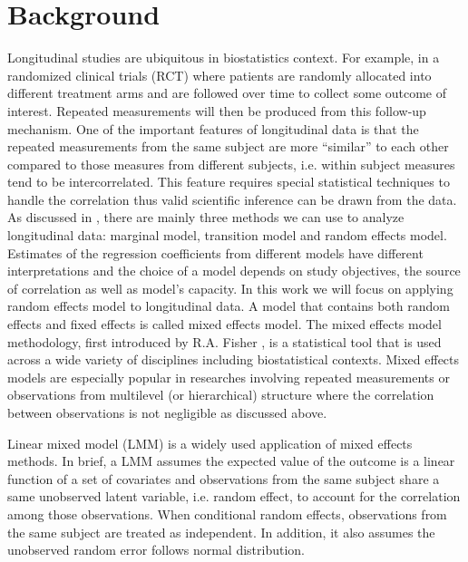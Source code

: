 \documentclass{article}
\begin{document}
\section{Background}
Longitudinal studies are ubiquitous in biostatistics context. For example, in a randomized clinical trials (RCT) where patients are randomly allocated into different treatment arms and are followed over time to collect some outcome of interest. Repeated measurements will then be produced from this follow-up mechanism. One of the important features of longitudinal data is that the repeated measurements from the same subject are more ``similar'' to each other compared to those measures from different subjects, i.e. within subject measures tend to be intercorrelated. This feature requires special statistical techniques to handle the correlation thus valid scientific inference can be drawn from the data. As discussed in \citep{diggle2002analysis}, there are mainly three methods we can use to analyze longitudinal data: marginal model, transition model and random effects model. Estimates of the regression coefficients from different models have different interpretations and the choice of a model depends on study objectives, the source of correlation as well as model's capacity. In this work we will focus on applying random effects model to longitudinal data. A model that contains both random effects and fixed effects is called mixed effects model. The mixed effects model methodology, first introduced by R.A. Fisher \citep{fisher1919xv},  is a statistical tool that is used across a wide variety of disciplines including biostatistical contexts. Mixed effects models are especially popular in researches involving repeated measurements or observations from multilevel (or hierarchical) structure where the correlation between observations is not negligible as discussed above.\par

Linear mixed model (LMM) is a widely used application of mixed effects methods. In brief, a LMM assumes the expected value of the outcome is a linear function of a set of covariates and observations from the same subject share a same unobserved latent variable, i.e. random effect, to account for the correlation among those observations. When conditional random effects, observations from the same subject are treated as independent. In addition, it also assumes the unobserved random error follows normal distribution.
\end{document}
